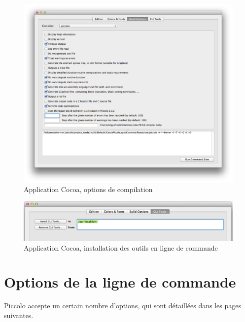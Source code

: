 \begin{figure}[!ht]
  \centering
  \includegraphics[width=1\textwidth]{images/build-options.pdf}
  \caption{Application Cocoa, options de compilation}
\end{figure}



\begin{figure}[!ht]
  \centering
  \includegraphics[width=1\textwidth]{images/installation-cli-tools.pdf}
  \caption{Application Cocoa, installation des outils en ligne de commande}
\end{figure}



\section{Options de la ligne de commande}


Piccolo accepte un certain nombre d’options, qui sont détaillées dans les pages suivantes.

